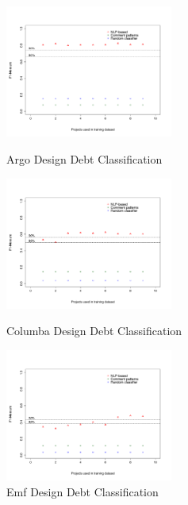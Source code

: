 \begin{figure}[thb!]
  \centering
  \vspace{-5mm}
  \includegraphics[width=0.49\textwidth]{figures/appendix/iteration_details/design_argo.pdf}
  \vspace{-9mm}
  \caption{Argo Design Debt Classification}
  \label{fig:design_argo}
  \includegraphics[width=0.49\textwidth]{figures/appendix/iteration_details/design_columba.pdf}
  \vspace{-9mm}
  \caption{Columba Design Debt Classification}
  \label{fig:design_columba}
  \includegraphics[width=0.49\textwidth]{figures/appendix/iteration_details/design_emf.pdf}
  \vspace{-9mm}
  \caption{Emf Design Debt Classification}
  \label{fig:design_emf}
\end{figure}


